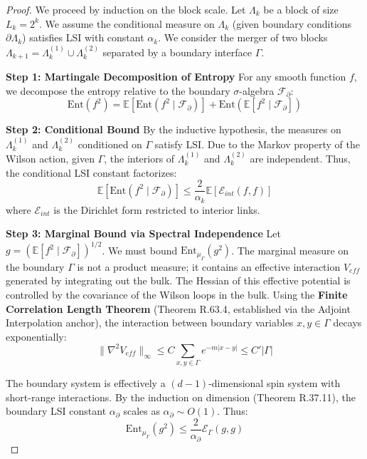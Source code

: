 \begin{proof}
We proceed by induction on the block scale. Let $\Lambda_k$ be a block of size $L_k = 2^k$. We assume the conditional measure on $\Lambda_k$ (given boundary conditions $\partial \Lambda_k$) satisfies LSI with constant $\alpha_k$. We consider the merger of two blocks $\Lambda_{k+1} = \Lambda_k^{(1)} \cup \Lambda_k^{(2)}$ separated by a boundary interface $\Gamma$.

\textbf{Step 1: Martingale Decomposition of Entropy}
For any smooth function $f$, we decompose the entropy relative to the boundary $\sigma$-algebra $\mathcal{F}_\partial$:
\begin{equation}
\mathrm{Ent}(f^2) = \mathbb{E}[\mathrm{Ent}(f^2 \mid \mathcal{F}_\partial)] + \mathrm{Ent}(\mathbb{E}[f^2 \mid \mathcal{F}_\partial])
\end{equation}

\textbf{Step 2: Conditional Bound}
By the inductive hypothesis, the measures on $\Lambda_k^{(1)}$ and $\Lambda_k^{(2)}$ conditioned on $\Gamma$ satisfy LSI. Due to the Markov property of the Wilson action, given $\Gamma$, the interiors of $\Lambda_k^{(1)}$ and $\Lambda_k^{(2)}$ are independent. Thus, the conditional LSI constant factorizes:
\begin{equation}
\mathbb{E}[\mathrm{Ent}(f^2 \mid \mathcal{F}_\partial)] \le \frac{2}{\alpha_k} \mathbb{E}[\mathcal{E}_{int}(f,f)]
\end{equation}
where $\mathcal{E}_{int}$ is the Dirichlet form restricted to interior links.

\textbf{Step 3: Marginal Bound via Spectral Independence}
Let $g = (\mathbb{E}[f^2 \mid \mathcal{F}_\partial])^{1/2}$. We must bound $\mathrm{Ent}_{\mu_\Gamma}(g^2)$. The marginal measure on the boundary $\Gamma$ is not a product measure; it contains an effective interaction $V_{eff}$ generated by integrating out the bulk.
The Hessian of this effective potential is controlled by the covariance of the Wilson loops in the bulk. Using the \textbf{Finite Correlation Length Theorem} (Theorem R.63.4, established via the Adjoint Interpolation anchor), the interaction between boundary variables $x, y \in \Gamma$ decays exponentially:
\begin{equation}
\|\nabla^2 V_{eff}\|_\infty \le C \sum_{x,y \in \Gamma} e^{-m|x-y|} \le C' |\Gamma|
\end{equation}

The boundary system is effectively a $(d-1)$-dimensional spin system with short-range interactions. By the induction on dimension (Theorem R.37.11), the boundary LSI constant $\alpha_\partial$ scales as $\alpha_\partial \sim O(1)$. Thus:
\begin{equation}
\mathrm{Ent}_{\mu_\Gamma}(g^2) \le \frac{2}{\alpha_\partial} \mathcal{E}_\Gamma(g,g)
\end{equation}


\end{proof}
